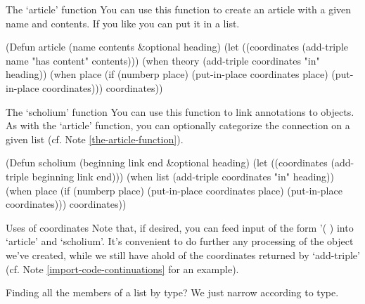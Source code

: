 \begin{notate}{The `article' function} \label{the-article-function}
You can use this function to create an article with a
given name and contents.  If you like you can put it in a
list.
\end{notate}

\begin{elisp}
(Defun article (name contents &optional heading)
  (let ((coordinates (add-triple name
                                 "has content"
                                 contents)))
    (when theory (add-triple coordinates "in" heading))
    (when place (if (numberp place)
                    (put-in-place coordinates place)
                  (put-in-place coordinates)))
    coordinates))
\end{elisp}

\begin{notate}{The `scholium' function} \label{the-scholium-function}
You can use this function to link annotations to objects.
As with the `article' function, you can optionally
categorize the connection on a given list (cf. Note
\ref{the-article-function}).
\end{notate}

\begin{elisp}
(Defun scholium (beginning link end &optional heading)
  (let ((coordinates (add-triple beginning
                                 link
                                 end)))
    (when list (add-triple coordinates "in" heading))
    (when place (if (numberp place)
                    (put-in-place coordinates place)
                  (put-in-place coordinates)))
    coordinates))
\end{elisp}

\begin{notate}{Uses of coordinates}
Note that, if desired, you can feed input of the form
'( ) into `article' and `scholium'.
It's convenient to do further any processing of the object
we've created, while we still have ahold of the coordinates
returned by `add-triple' (cf. Note
\ref{import-code-continuations} for an example).
\end{notate}

\begin{notate}{Finding all the members of a list by type?}
We just narrow according to type.
\end{notate}

